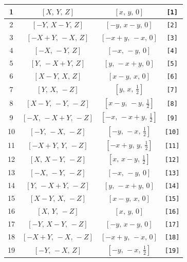 \documentclass[fleqn,8pt]{jsarticle}
\begin{document}
\begin{longtable}{cccc}
1 & $\left[ X,\, Y,\, Z \right]$ & $\left[ x,\, y,\, 0 \right]$ & {\tt [1]} \\ \hline
2 & $\left[ - Y,\, X - Y,\, Z \right]$ & $\left[ - y,\, x - y,\, 0 \right]$ & {\tt [2]} \\ \hline
3 & $\left[ - X + Y,\, - X,\, Z \right]$ & $\left[ - x + y,\, - x,\, 0 \right]$ & {\tt [3]} \\ \hline
4 & $\left[ - X,\, - Y,\, Z \right]$ & $\left[ - x,\, - y,\, 0 \right]$ & {\tt [4]} \\ \hline
5 & $\left[ Y,\, - X + Y,\, Z \right]$ & $\left[ y,\, - x + y,\, 0 \right]$ & {\tt [5]} \\ \hline
6 & $\left[ X - Y,\, X,\, Z \right]$ & $\left[ x - y,\, x,\, 0 \right]$ & {\tt [6]} \\ \hline
7 & $\left[ Y,\, X,\, - Z \right]$ & $\left[ y,\, x,\, \frac{1}{2} \right]$ & {\tt [7]} \\ \hline
8 & $\left[ X - Y,\, - Y,\, - Z \right]$ & $\left[ x - y,\, - y,\, \frac{1}{2} \right]$ & {\tt [8]} \\ \hline
9 & $\left[ - X,\, - X + Y,\, - Z \right]$ & $\left[ - x,\, - x + y,\, \frac{1}{2} \right]$ & {\tt [9]} \\ \hline
10 & $\left[ - Y,\, - X,\, - Z \right]$ & $\left[ - y,\, - x,\, \frac{1}{2} \right]$ & {\tt [10]} \\ \hline
11 & $\left[ - X + Y,\, Y,\, - Z \right]$ & $\left[ - x + y,\, y,\, \frac{1}{2} \right]$ & {\tt [11]} \\ \hline
12 & $\left[ X,\, X - Y,\, - Z \right]$ & $\left[ x,\, x - y,\, \frac{1}{2} \right]$ & {\tt [12]} \\ \hline
13 & $\left[ - X,\, - Y,\, - Z \right]$ & $\left[ - x,\, - y,\, 0 \right]$ & {\tt [13]} \\ \hline
14 & $\left[ Y,\, - X + Y,\, - Z \right]$ & $\left[ y,\, - x + y,\, 0 \right]$ & {\tt [14]} \\ \hline
15 & $\left[ X - Y,\, X,\, - Z \right]$ & $\left[ x - y,\, x,\, 0 \right]$ & {\tt [15]} \\ \hline
16 & $\left[ X,\, Y,\, - Z \right]$ & $\left[ x,\, y,\, 0 \right]$ & {\tt [16]} \\ \hline
17 & $\left[ - Y,\, X - Y,\, - Z \right]$ & $\left[ - y,\, x - y,\, 0 \right]$ & {\tt [17]} \\ \hline
18 & $\left[ - X + Y,\, - X,\, - Z \right]$ & $\left[ - x + y,\, - x,\, 0 \right]$ & {\tt [18]} \\ \hline
19 & $\left[ - Y,\, - X,\, Z \right]$ & $\left[ - y,\, - x,\, \frac{1}{2} \right]$ & {\tt [19]} \\ \hline

\end{longtable}
\end{document}
